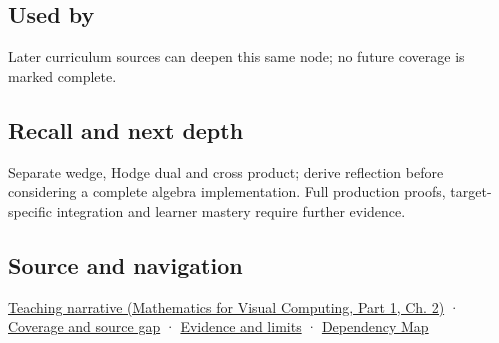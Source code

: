 \subsection{Used by}\label{appendix-e1960925d1b8-used-by}

\hypertarget{appendix-e1960925d1b8-used-by}{}

Later curriculum sources can deepen this same node; no future coverage is marked complete.

\subsection{Recall and next depth}\label{appendix-e1960925d1b8-recall-and-next-depth}

\hypertarget{appendix-e1960925d1b8-recall-and-next-depth}{}

Separate wedge, Hodge dual and cross product; derive reflection before considering a complete algebra implementation. Full production proofs, target-specific integration and learner mastery require further evidence.

\subsection{Source and navigation}\label{appendix-e1960925d1b8-source-and-navigation}

\hypertarget{appendix-e1960925d1b8-source-and-navigation}{}

\href{../02-Mathematics-for-Visual-Computing-P01/main.pdf\#nameddest=01-foundations-i-ch018-oriented-areas-deserve-their-own-representation}{Teaching narrative (Mathematics for Visual Computing, Part 1, Ch. 2)} · \hyperref[appendix-fd090d982a15-phase-6---parts-501-600]{Coverage and source gap} · \hyperref[appendix-a103e7846d21-phase-6---source-analysis-and-verification]{Evidence and limits} · \hyperref[appendix-4ad47bdd269a]{Dependency Map}
